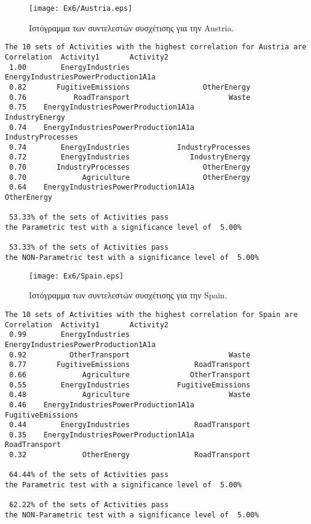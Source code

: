 \documentclass[11pt]{scrartcl} %
\begin{document}
\begin{figure}[H]
\label{fig:z61} 
	\centering
	\texttt{[image: Ex6/Austria.eps]}	
\caption{Ιστόγραμμα των συντελεστών συσχέτισης για την Austria.}
\end{figure}



\begin{verbatim}
The 10 sets of Activities with the highest correlation for Austria are
Correlation	 Activity1	 	 Activity2
 1.00	     EnergyIndustries	 	 EnergyIndustriesPowerProduction1A1a 
 0.82	    FugitiveEmissions	 	          OtherEnergy 
 0.76	        RoadTransport	 	                Waste 
 0.75	 EnergyIndustriesPowerProduction1A1a	 	       IndustryEnergy 
 0.74	 EnergyIndustriesPowerProduction1A1a	 	    IndustryProcesses 
 0.74	     EnergyIndustries	 	    IndustryProcesses 
 0.72	     EnergyIndustries	 	       IndustryEnergy 
 0.70	    IndustryProcesses	 	          OtherEnergy 
 0.70	          Agriculture	 	          OtherEnergy 
 0.64	 EnergyIndustriesPowerProduction1A1a	 	          OtherEnergy 

 53.33% of the sets of Activities pass 
the Parametric test with a significance level of  5.00%

 53.33% of the sets of Activities pass 
the NON-Parametric test with a significance level of  5.00%
\end{verbatim}


\begin{figure}[H]
\label{fig:z62} 
	\centering
	\texttt{[image: Ex6/Spain.eps]}	
\caption{Ιστόγραμμα των συντελεστών συσχέτισης για την Spain.}
\end{figure}



\begin{verbatim}
The 10 sets of Activities with the highest correlation for Spain are
Correlation	 Activity1	 	 Activity2
 0.99	     EnergyIndustries	 	 EnergyIndustriesPowerProduction1A1a 
 0.92	       OtherTransport	 	                Waste 
 0.77	    FugitiveEmissions	 	        RoadTransport 
 0.66	          Agriculture	 	       OtherTransport 
 0.55	     EnergyIndustries	 	    FugitiveEmissions 
 0.48	          Agriculture	 	                Waste 
 0.46	 EnergyIndustriesPowerProduction1A1a	 	    FugitiveEmissions 
 0.44	     EnergyIndustries	 	        RoadTransport 
 0.35	 EnergyIndustriesPowerProduction1A1a	 	        RoadTransport 
 0.32	          OtherEnergy	 	        RoadTransport 

 64.44% of the sets of Activities pass 
the Parametric test with a significance level of  5.00%

 62.22% of the sets of Activities pass 
the NON-Parametric test with a significance level of  5.00%
\end{verbatim}
\end{document}
